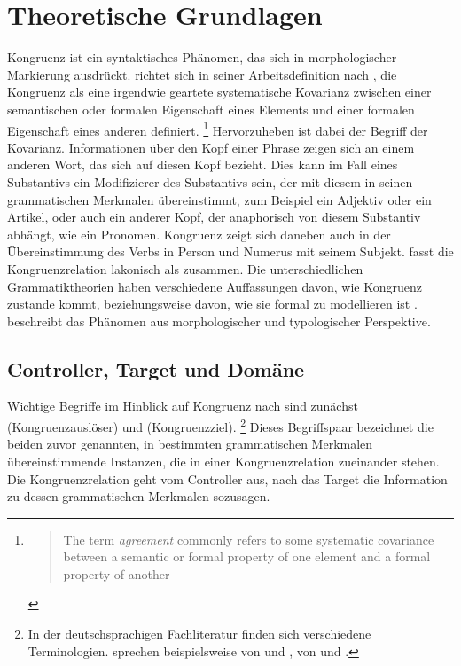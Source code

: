 \chapter{Theoretische Grundlagen}
\label{ch:theorie}

Kongruenz ist ein syntaktisches Phänomen, das sich in morphologischer
Markierung ausdrückt. \citet{corbett2006} richtet sich in seiner
Arbeitsdefinition nach \citet[610]{steele1978}, die Kongruenz als eine
irgendwie geartete systematische Kovarianz zwischen einer semantischen oder
formalen Eigenschaft eines Elements und einer formalen Eigenschaft eines
anderen definiert.%
%
	\footnote{\blockcquote[610]{steele1978}{The term \emph{agreement} commonly
		refers to some systematic covariance between a semantic or formal
		property of one element and a formal property of another}.%
	}
%
Hervorzuheben ist dabei der Begriff der Kovarianz. Informationen über den Kopf
einer Phrase zeigen sich an einem anderen Wort, das sich auf diesen Kopf
bezieht. Dies kann im Fall eines Substantivs ein Modifizierer des Substantivs
sein, der mit diesem in seinen grammatischen Merkmalen übereinstimmt, zum
Beispiel ein Adjektiv oder ein Artikel, oder auch ein anderer Kopf, der
anaphorisch von diesem Substantiv abhängt, wie ein Pronomen. Kongruenz zeigt
sich daneben auch in der Übereinstimmung des Verbs in Person und Numerus mit
seinem Subjekt. \citet[20]{corbett2006} fasst die Kongruenzrelation lakonisch
als  zusammen. Die
unterschiedlichen Grammatiktheorien haben verschiedene Auffassungen davon, wie
Kongruenz zustande kommt, beziehungsweise davon, wie sie formal zu modellieren
ist \autocite[siehe~z.\,B.][]{mueller2020}. \citeauthor{corbett2006} beschreibt
das Phänomen aus morphologischer und typologischer Perspektive.

\section{Controller, Target und Domäne}
\label{sec:ctrltarg}

Wichtige Begriffe im Hinblick auf Kongruenz nach \citet{corbett2006} sind
zunächst  (Kongruenzauslöser) und  (Kongruenzziel).%
%
	\footnote{In der deutschsprachigen Fachliteratur finden sich verschiedene
	Terminologien. \citet{fleischerschallert2011} sprechen beispielsweise von
	 und , \citet{panther2009} von
	 und .}
%
Dieses Begriffspaar bezeichnet die beiden zuvor genannten, in bestimmten
grammatischen Merkmalen übereinstimmende Instanzen, die in einer
Kongruenzrelation zueinander stehen. Die Kongruenzrelation geht vom Controller
aus, nach \citeauthor{corbett2006}  das Target die Information zu
dessen grammatischen Merkmalen sozusagen.

